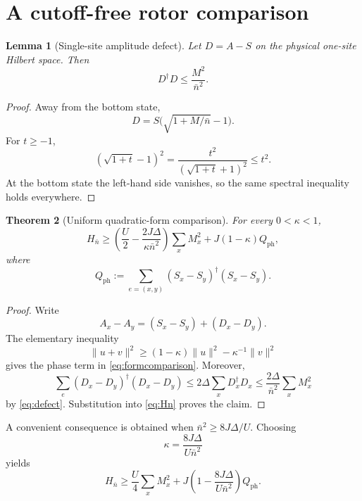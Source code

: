 \documentclass[11pt]{article}
\newtheorem{theorem}{Theorem}[section]
\newtheorem{lemma}[theorem]{Lemma}
\newcommand{\nbar}{\bar n}
\begin{document}
\section{A cutoff-free rotor comparison}

\begin{lemma}[Single-site amplitude defect]
Let $D=A-S$ on the physical one-site Hilbert space. Then
\begin{equation}
D^\dagger D\le \frac{M^2}{\nbar^2}.
\label{eq:defect}
\end{equation}
\end{lemma}

\begin{proof}
Away from the bottom state,
\[
D=S\bigl(\sqrt{1+M/\nbar}-1\bigr).
\]
For $t\ge-1$,
\[
(\sqrt{1+t}-1)^2
=\frac{t^2}{(\sqrt{1+t}+1)^2}
\le t^2.
\]
At the bottom state the left-hand side vanishes, so the same spectral inequality holds everywhere.
\end{proof}

\begin{theorem}[Uniform quadratic-form comparison]
For every $0<\kappa<1$,
\begin{equation}
H_{\nbar}\ge
\left(\frac U2-\frac{2J\Delta}{\kappa\nbar^2}\right)\sum_xM_x^2
+J(1-\kappa)Q_{\mathrm{ph}},
\label{eq:formcomparison}
\end{equation}
where
\begin{equation}
Q_{\mathrm{ph}}:=\sum_{e=(x,y)}(S_x-S_y)^\dagger(S_x-S_y).
\end{equation}
\end{theorem}

\begin{proof}
Write
\[
A_x-A_y=(S_x-S_y)+(D_x-D_y).
\]
The elementary inequality
\[
\|u+v\|^2\ge(1-\kappa)\|u\|^2-\kappa^{-1}\|v\|^2
\]
gives the phase term in \eqref{eq:formcomparison}. Moreover,
\[
\sum_e(D_x-D_y)^\dagger(D_x-D_y)
\le 2\Delta\sum_xD_x^\dagger D_x
\le \frac{2\Delta}{\nbar^2}\sum_xM_x^2
\]
by \eqref{eq:defect}. Substitution into \eqref{eq:Hn} proves the claim.
\end{proof}

A convenient consequence is obtained when $\nbar^2\ge8J\Delta/U$. Choosing
\[
\kappa=\frac{8J\Delta}{U\nbar^2}
\]
yields
\begin{equation}
H_{\nbar}\ge
\frac U4\sum_xM_x^2
+J\left(1-\frac{8J\Delta}{U\nbar^2}\right)Q_{\mathrm{ph}}.
\label{eq:convenientform}
\end{equation}
\end{document}
